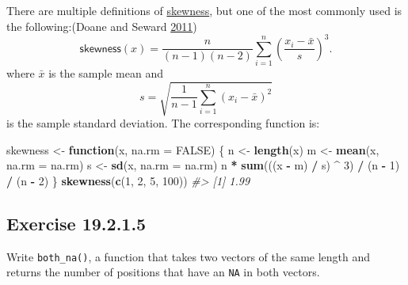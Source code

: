 \documentclass[]{book}
\newenvironment{Shaded}{\begin{snugshade}}{\end{snugshade}}
\newcommand{\CommentTok}[1]{\textcolor[rgb]{0.56,0.35,0.01}{\textit{#1}}}
\newcommand{\ControlFlowTok}[1]{\textcolor[rgb]{0.13,0.29,0.53}{\textbf{#1}}}
\newcommand{\DataTypeTok}[1]{\textcolor[rgb]{0.13,0.29,0.53}{#1}}
\newcommand{\DecValTok}[1]{\textcolor[rgb]{0.00,0.00,0.81}{#1}}
\newcommand{\KeywordTok}[1]{\textcolor[rgb]{0.13,0.29,0.53}{\textbf{#1}}}
\newcommand{\NormalTok}[1]{#1}
\newcommand{\OperatorTok}[1]{\textcolor[rgb]{0.81,0.36,0.00}{\textbf{#1}}}
\newcommand{\OtherTok}[1]{\textcolor[rgb]{0.56,0.35,0.01}{#1}}
\newcommand{\StringTok}[1]{\textcolor[rgb]{0.31,0.60,0.02}{#1}}
\theoremstyle{plain}
\theoremstyle{remark}
\begin{document}
There are multiple definitions of \href{https://en.wikipedia.org/wiki/Skewness}{skewness},
but one of the most commonly used is the following:(Doane and Seward \protect\hyperlink{ref-DoaneSeward2011}{2011})
\[
\mathsf{skewness}(x) = \frac{n}{(n - 1)(n - 2)} \sum_{i = 1}^{n} {\left( \frac{x_i - \bar{x}}{s} \right)}^{3} .
\]
where \(\bar{x}\) is the sample mean and
\[
s = \sqrt{\frac{1}{n - 1} \sum_{i = 1}^{n} (x_i - \bar{x})^2}
\]
is the sample standard deviation.
The corresponding function is:

\begin{Shaded}
\begin{Highlighting}[]
\NormalTok{skewness <-}\StringTok{ }\ControlFlowTok{function}\NormalTok{(x, }\DataTypeTok{na.rm =} \OtherTok{FALSE}\NormalTok{) \{}
\NormalTok{  n <-}\StringTok{ }\KeywordTok{length}\NormalTok{(x)}
\NormalTok{  m <-}\StringTok{ }\KeywordTok{mean}\NormalTok{(x, }\DataTypeTok{na.rm =}\NormalTok{ na.rm)}
\NormalTok{  s <-}\StringTok{ }\KeywordTok{sd}\NormalTok{(x, }\DataTypeTok{na.rm =}\NormalTok{ na.rm)}
\NormalTok{  n }\OperatorTok{*}\StringTok{ }\KeywordTok{sum}\NormalTok{(((x }\OperatorTok{-}\StringTok{ }\NormalTok{m) }\OperatorTok{/}\StringTok{ }\NormalTok{s) }\OperatorTok{^}\StringTok{ }\DecValTok{3}\NormalTok{) }\OperatorTok{/}\StringTok{ }\NormalTok{(n }\OperatorTok{-}\StringTok{ }\DecValTok{1}\NormalTok{) }\OperatorTok{/}\StringTok{ }\NormalTok{(n }\OperatorTok{-}\StringTok{ }\DecValTok{2}\NormalTok{)}
\NormalTok{\}}
\KeywordTok{skewness}\NormalTok{(}\KeywordTok{c}\NormalTok{(}\DecValTok{1}\NormalTok{, }\DecValTok{2}\NormalTok{, }\DecValTok{5}\NormalTok{, }\DecValTok{100}\NormalTok{))}
\CommentTok{#> [1] 1.99}
\end{Highlighting}
\end{Shaded}

\hypertarget{exercise-19.2.1.5}{%
\subsection*{\texorpdfstring{Exercise {19.2.1.5}}{Exercise 19.2.1.5}}\label{exercise-19.2.1.5}}

Write \texttt{both\_na()}, a function that takes two vectors of the same length and returns the number of positions that have an \texttt{NA} in both vectors.
\end{document}
